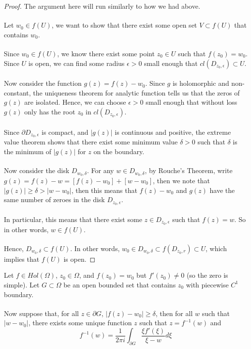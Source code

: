 \documentclass{article}
\begin{document}
\begin{proof}
The argument here will run similarly to how we had above.\\\\
Let $w_0 \in f(U)$, we want to show that there exist some open set $V \subset f(U)$ that contains $w_0$.\\\\
Since $w_0 \in f(U)$, we know there exist some point $z_0 \in U$ such that $f(z_0) = w_0$. Since $U$ is open, we can find some radius $\epsilon > 0$ small enough that $cl(D_{z_0, \epsilon}) \subset U$.\\\\
Now consider the function $g(z) = f(z) - w_0$. Since $g$ is holomorphic and non-constant, the uniqueness theorem for analytic function tells us that the zeros of $g(z)$ are isolated. Hence, we can choose $\epsilon > 0$ small enough that without loss $g(z)$ only has the root $z_0$ in $cl(D_{z_0, \epsilon})$.\\\\
Since $\partial D_{z_0, \epsilon}$ is compact, and $|g(z)|$ is continuous and positive, the extreme value theorem shows that there exist some minimum value $\delta > 0$ such that $\delta$ is the minimum of $|g(z)|$ for $z$ on the boundary.\\\\
Now consider the disk $D_{w_0, \delta}$. For any $w \in D_{w_0, \delta}$, by Rouche's Theorem, write $g(z) = f(z) - w = [f(z) - w_0] + [w - w_0]$, then we note that $|g(z)| \geq \delta > |w - w_0|$, then this means that $f(z) - w_0$ and $g(z)$ have the same number of zeroes in the disk $D_{z_0, \epsilon}$.\\\\
In particular, this means that there exist some $z \in D_{z_0, \epsilon}$ such that $f(z) = w$. So in other words, $w \in f(U)$.\\\\
Hence, $D_{w_0, \delta} \subset f(U)$. In other words, $w_0 \in D_{w_0, \delta} \subset f(D_{z_0, r}) \subset U$, which implies that $f(U)$ is open.
\end{proof}

\begin{theorem}
Let $f \in Hol(\Omega)$, $z_0 \in \Omega$, and $f(z_0) = w_0$ but $f'(z_0) \neq 0$ (so the zero is simple). Let $G \subset \Omega$ be an open bounded set that contains $z_0$ with piecewise $C^1$ boundary.\\\\
Now suppose that, for all $z \in \partial G$, $|f(z) - w_0| \geq \delta$, then for all $w$ such that $|w - w_0|$, there exists some unique function $z$ such that $z = f^{-1}(w)$ and
\[f^{-1}(w) = \frac{1}{2\pi i} \int_{\partial G} \frac{\xi f'(\xi)}{\xi - w} d\xi\]
\end{theorem}
\end{document}

